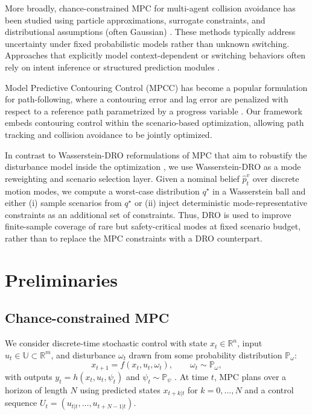 \documentclass[letterpaper,10pt,conference]{ieeeconf}
\begin{document}
More broadly, chance-constrained MPC for multi-agent collision avoidance has been studied using particle approximations, surrogate constraints, and distributional assumptions (often Gaussian) \cite{Blackmore2010ProbParticle,Gopalakrishnan2016CCMulti,Lyons2012CCMPCMulti,Zhu2019CCColl,wang2020NonGauss}. These methods typically address uncertainty under fixed probabilistic models rather than unknown switching. Approaches that explicitly model context-dependent or switching behaviors often rely on intent inference or structured prediction modules \cite{Kooij2019Context-based}.

Model Predictive Contouring Control (MPCC) has become a popular formulation for path-following, where a contouring error and lag error are penalized with respect to a reference path parametrized by a progress variable \cite{Liniger2014MPCCRacing}. Our framework embeds contouring control within the scenario-based optimization, allowing path tracking and collision avoidance to be jointly optimized.

In contrast to Wasserstein-DRO reformulations of MPC that aim to robustify the disturbance model inside the optimization \cite{kuhn2019wdro,gao2023drso,Hakobyan2020WDRO,Zhong2021DDRMPC},
we use Wasserstein-DRO as a mode reweighting and scenario selection layer.
Given a nominal belief $\widehat p_t^v$ over discrete motion modes, we compute a worst-case
distribution $q^\star$ in a Wasserstein ball and either (i) sample scenarios from $q^\star$
or (ii) inject deterministic mode-representative constraints as an additional set of constraints.
Thus, DRO is used to improve finite-sample coverage of rare but safety-critical modes at
fixed scenario budget, rather than to replace the MPC constraints with a DRO counterpart.


\section{Preliminaries}\label{preliminaries}

\subsection{Chance-constrained MPC}\label{sec:cc_prelim}

We consider discrete-time stochastic control with state $x_t\in\mathbb{R}^n$, input $u_t\in\mathbb{U}\subset\mathbb{R}^m$, and disturbance $\omega_t$ drawn from some probability distribution $\mathbb{P}_\omega$:
\begin{equation}\label{eq:dyn_general}
x_{t+1} = f(x_t,u_t,\omega_t), \qquad \omega_t \sim \mathbb{P}_\omega,
\end{equation}
with outputs $y_t = h(x_t,u_t,\psi_t)$ and $\psi_t \sim \mathbb{P}_\psi$ \cite{Mesbah2016SMPCOverview}.
At time $t$, MPC plans over a horizon of length $N$ using predicted states $x_{t+k|t}$ for $k=0,\dots,N$ and a control sequence $U_t = (u_{t|t},\dots,u_{t+N-1|t})$.
\end{document}
